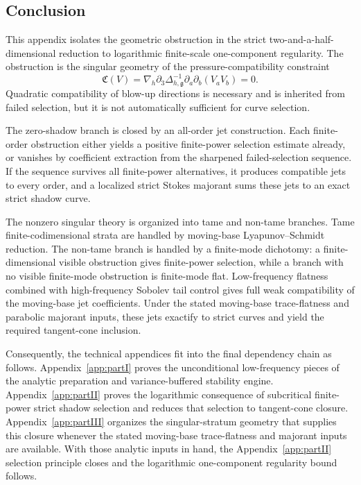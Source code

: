 \documentclass[11pt]{article}
\numberwithin{equation}{section}
\theoremstyle{plain}
\theoremstyle{definition}
\theoremstyle{remark}
\newcommand{\nabh}{\nabla_h}
\newcommand{\calC}{\mathfrak C}
\begin{document}
\subsection{Conclusion}\label{pIII:sec:conclusion}

This appendix isolates the geometric obstruction in the strict two-and-a-half-dimensional reduction to
logarithmic finite-scale one-component regularity.  The obstruction is the singular geometry of the
pressure-compatibility constraint
\[
        \calC(V)=\nabh\partial_3\Delta_{h,\mathfrak g}^{-1}\partial_a\partial_b(V_aV_b)=0.
\]
Quadratic compatibility of blow-up directions is necessary and is inherited from failed selection,
but it is not automatically sufficient for curve selection.

The zero-shadow branch is closed by an all-order jet construction.  Each finite-order obstruction either
yields a positive finite-power selection estimate already, or vanishes by coefficient extraction from
the sharpened failed-selection sequence.  If the sequence survives all finite-power alternatives, it
produces compatible jets to every order, and a localized strict Stokes majorant sums these jets to an
exact strict shadow curve.

The nonzero singular theory is organized into tame and non-tame branches.  Tame finite-codimensional
strata are handled by moving-base Lyapunov--Schmidt reduction.  The non-tame branch is handled by a
finite-mode dichotomy: a finite-dimensional visible obstruction gives finite-power selection, while a
branch with no visible finite-mode obstruction is finite-mode flat.  Low-frequency flatness combined
with high-frequency Sobolev tail control gives full weak compatibility of the moving-base jet
coefficients.  Under the stated moving-base trace-flatness and parabolic majorant inputs, these jets
exactify to strict curves and yield the required tangent-cone inclusion.

Consequently, the technical appendices fit into the final dependency chain as follows.  Appendix~\ref{app:partI} proves the unconditional low-frequency pieces of the analytic preparation and
variance-buffered stability engine.  Appendix~\ref{app:partII} proves the logarithmic consequence of subcritical
finite-power strict shadow selection and reduces that selection to tangent-cone closure.  Appendix~\ref{app:partIII}
organizes the singular-stratum geometry that supplies this closure whenever the stated moving-base
trace-flatness and majorant inputs are available.  With those analytic inputs in hand, the Appendix~\ref{app:partII}
selection principle closes and the logarithmic one-component regularity bound follows.
\end{document}
